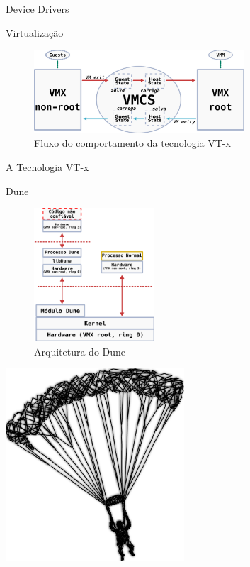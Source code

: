 \documentclass[xcolor={usenames,svgnames,dvipsnames},brazil,english,12pt,aspectratio=149]{beamer}
\begin{document}
\begin{frame}{Device Drivers}
\end{frame}

\begin{frame}{Virtualização}
	\begin{figure}[!h]
		\centering
		\includegraphics[width=0.7\textwidth]{vt-x_flow} 
		\caption{Fluxo do comportamento da tecnologia VT-x}
		\label{fig:vt-x_flow}
	\end{figure}
\end{frame}

\begin{frame}{A Tecnologia VT-x}
\end{frame}


\begin{frame}{Dune}
	\begin{figure}[!h]
		\centering
		\includegraphics[width=0.4\textwidth]{dune_architecture} 
		\caption[Arquitetura do Dune]{Arquitetura do Dune}
		\label{fig:dune_architecture}
	\end{figure}
\end{frame}

\begin{frame}[plain]
  \includegraphics[width=0.5\textwidth]{presentation_cap2_one}
\end{frame}
\end{document}
